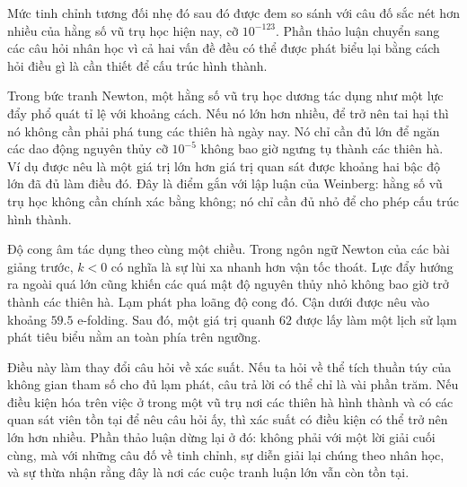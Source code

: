 Mức tinh chỉnh tương đối nhẹ đó sau đó được đem so sánh với câu đố sắc nét hơn nhiều của hằng số vũ trụ học hiện nay, cỡ \(10^{-123}\). Phần thảo luận chuyển sang các câu hỏi nhân học vì cả hai vấn đề đều có thể được phát biểu lại bằng cách hỏi điều gì là cần thiết để cấu trúc hình thành.

Trong bức tranh Newton, một hằng số vũ trụ học dương tác dụng như một lực đẩy phổ quát tỉ lệ với khoảng cách. Nếu nó lớn hơn nhiều, để trở nên tai hại thì nó không cần phải phá tung các thiên hà ngày nay. Nó chỉ cần đủ lớn để ngăn các dao động nguyên thủy cỡ \(10^{-5}\) không bao giờ ngưng tụ thành các thiên hà. Ví dụ được nêu là một giá trị lớn hơn giá trị quan sát được khoảng hai bậc độ lớn đã đủ làm điều đó. Đây là điểm gắn với lập luận của Weinberg: hằng số vũ trụ học không cần chính xác bằng không; nó chỉ cần đủ nhỏ để cho phép cấu trúc hình thành.

Độ cong âm tác dụng theo cùng một chiều. Trong ngôn ngữ Newton của các bài giảng trước, \(k<0\) có nghĩa là sự lùi xa nhanh hơn vận tốc thoát. Lực đẩy hướng ra ngoài quá lớn cũng khiến các quá mật độ nguyên thủy nhỏ không bao giờ trở thành các thiên hà. Lạm phát pha loãng độ cong đó. Cận dưới được nêu vào khoảng \(59.5\) e-folding. Sau đó, một giá trị quanh \(62\) được lấy làm một lịch sử lạm phát tiêu biểu nằm an toàn phía trên ngưỡng.

Điều này làm thay đổi câu hỏi về xác suất. Nếu ta hỏi về thể tích thuần túy của không gian tham số cho đủ lạm phát, câu trả lời có thể chỉ là vài phần trăm. Nếu điều kiện hóa trên việc ở trong một vũ trụ nơi các thiên hà hình thành và có các quan sát viên tồn tại để nêu câu hỏi ấy, thì xác suất có điều kiện có thể trở nên lớn hơn nhiều. Phần thảo luận dừng lại ở đó: không phải với một lời giải cuối cùng, mà với những câu đố về tinh chỉnh, sự diễn giải lại chúng theo nhân học, và sự thừa nhận rằng đây là nơi các cuộc tranh luận lớn vẫn còn tồn tại.